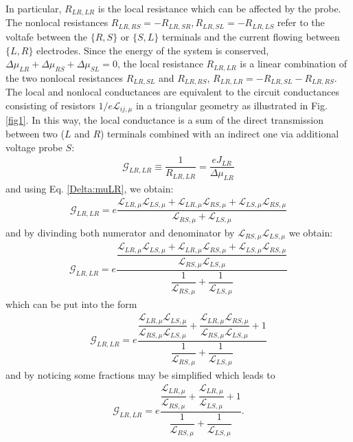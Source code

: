 In particular, $R_{LR,LR}$ is the local resistance which can be affected by the probe. The nonlocal resistances $R_{LR,RS}=-R_{LR,SR}, R_{LR,SL}=-R_{LR,LS}$ refer to the voltafe between the $\{R,S\}$ or $\{S,L\}$ terminals and the current flowing between $\{L,R\}$ electrodes. Since the energy of the system is conserved, $\Delta\mu_{LR}+\Delta\mu_{RS}+\Delta\mu_{SL}=0$, the local resistance $R_{LR,LR}$ is a linear combination of the two nonlocal resistances $R_{LR,SL}$ and $R_{LR,RS}$, $R_{LR,LR}=-R_{LR,SL}-R_{LR,RS}$. The local and nonlocal conductances are equivalent to the circuit conductances consisting of resistors $1/e\mathcal{L}_{ij,\mu}$ in a triangular geometry as illustrated in Fig. \ref{fig1}. In this way, the local conductance is a sum of the direct transmission between two ($L$ and $R$) terminals combined with an indirect one via additional voltage probe $S$:
\begin{align*}
\mathcal{G}_{LR,LR}\equiv\dfrac{1}{R_{LR,LR}}=\dfrac{eJ_{LR}}{\Delta\mu_{LR}}
\end{align*}
and using Eq. \eqref{Delta:muLR}, we obtain:
\begin{align*}
\mathcal{G}_{LR,LR}=
e\dfrac{\mathcal{L}_{LR,\mu} \mathcal{L}_{LS,\mu} +\mathcal{L}_{LR,\mu} \mathcal{L}_{RS,\mu} +\mathcal{L}_{LS,\mu} \mathcal{L}_{RS,\mu}}{\mathcal{L}_{RS,\mu}+\mathcal{L}_{LS,\mu}}
\end{align*}
and by divinding both numerator and denominator by $\mathcal{L}_{RS,\mu}\mathcal{L}_{LS,\mu}$ we obtain:
\begin{align*}
\mathcal{G}_{LR,LR}=
e\dfrac{\dfrac{\mathcal{L}_{LR,\mu} \mathcal{L}_{LS,\mu} + \mathcal{L}_{LR,\mu} \mathcal{L}_{RS,\mu} +\mathcal{L}_{LS,\mu} \mathcal{L}_{RS,\mu}}{\mathcal{L}_{RS,\mu}\mathcal{L}_{LS,\mu}}}{\dfrac{1}{\mathcal{L}_{RS,\mu}}+\dfrac{1}{\mathcal{L}_{LS,\mu}}}
\end{align*}
which can be put into the form
\begin{align*}
\mathcal{G}_{LR,LR}=
e\dfrac{\dfrac{\mathcal{L}_{LR,\mu} \mathcal{L}_{LS,\mu}}{\mathcal{L}_{RS,\mu}\mathcal{L}_{LS,\mu}}
+
\dfrac{\mathcal{L}_{LR,\mu} \mathcal{L}_{RS,\mu}}{\mathcal{L}_{RS,\mu}\mathcal{L}_{LS,\mu}}
+
1}{\dfrac{1}{\mathcal{L}_{RS,\mu}}+\dfrac{1}{\mathcal{L}_{LS,\mu}}}
\end{align*}
and by noticing some fractions may be simplified which leads to
\begin{align*}
\mathcal{G}_{LR,LR}=
e\dfrac{\dfrac{\mathcal{L}_{LR,\mu}}{\mathcal{L}_{RS,\mu}}
+
\dfrac{\mathcal{L}_{LR,\mu}}{\mathcal{L}_{LS,\mu}}
+
1}{\dfrac{1}{\mathcal{L}_{RS,\mu}}+\dfrac{1}{\mathcal{L}_{LS,\mu}}}.
\end{align*}

